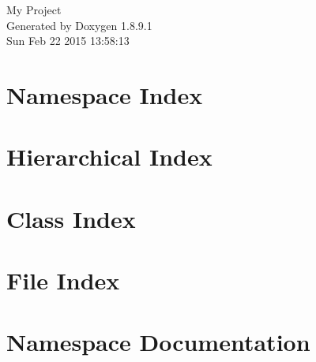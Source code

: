 \documentclass[twoside]{book}
\newcommand{\+}{\discretionary{\mbox{\scriptsize$\hookleftarrow$}}{}{}}
\newcommand{\clearemptydoublepage}{%
  \newpage{\pagestyle{empty}\cleardoublepage}%
}
\begin{document}
\hypersetup{pageanchor=false,
             bookmarks=true,
             bookmarksnumbered=true,
             pdfencoding=unicode
            }
\begin{titlepage}
\vspace*{7cm}
\begin{center}%
{\Large My Project }\\
\vspace*{1cm}
{\large Generated by Doxygen 1.8.9.1}\\
\vspace*{0.5cm}
{\small Sun Feb 22 2015 13:58:13}\\
\end{center}
\end{titlepage}
\clearemptydoublepage
\tableofcontents
\clearemptydoublepage
{}
\hypersetup{pageanchor=true}

\chapter{Namespace Index}

\chapter{Hierarchical Index}

\chapter{Class Index}

\chapter{File Index}

\chapter{Namespace Documentation}










\end{document}
